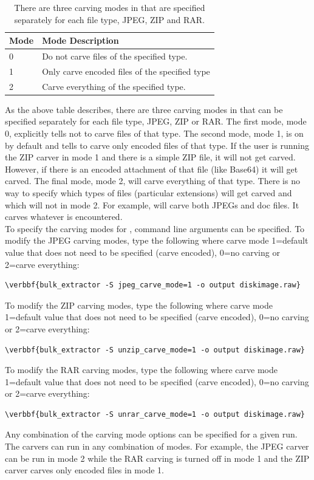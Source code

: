 \documentclass[11pt]{article} %
\begin{document}
\begin{table}[!ht]
\centering
\caption{There are three carving modes in \bulk that are specified separately for each file type, JPEG, ZIP and RAR.}
\label{tab:encodings}
\begin{tabular}{|m{2 cm}|m{7 cm}|}
\hline \hline
\textbf{Mode} & \textbf{Mode Description} \\
\hline
0 & Do not carve files of the specified type.\\
\hline
1 & Only carve encoded files of the specified type \\
\hline
2 & Carve everything of the specified type.\\
\hline
\end{tabular}
\end{table}

As the above table describes, there are three carving modes in \bulk that can be specified separately for each file type, JPEG, ZIP or RAR. The first mode, mode 0, explicitly tells \bulk not to carve files of that type. The second mode, mode 1, is on by default and tells \bulk to carve only encoded files of that type. If the user is running the ZIP carver in mode 1 and there is a simple ZIP file, it will not get carved. However, if there is an encoded attachment of that file (like Base64) it will get carved. The final mode, mode 2, will carve everything of that type. There is no way to specify which types of files (particular extensions) will get carved and which will not in mode 2. For example, \bulk will carve both JPEGs and doc files. It carves whatever is encountered.\\

To specify the carving modes for \bulk, command line arguments can be specified. To modify the JPEG carving modes, type the following where carve mode 1=default value that does not need to be specified (carve encoded), 0=no carving or 2=carve everything:
\begin{Verbatim}[commandchars=\\\{\}]
\verbbf{bulk_extractor -S jpeg_carve_mode=1 -o output diskimage.raw}
\end{Verbatim} 
To modify the ZIP carving modes, type the following  where carve mode 1=default value that does not need to be specified (carve encoded), 0=no carving or 2=carve everything:
\begin{Verbatim}[commandchars=\\\{\}]
\verbbf{bulk_extractor -S unzip_carve_mode=1 -o output diskimage.raw}
\end{Verbatim} 
To modify the RAR carving modes, type the following  where carve mode 1=default value that does not need to be specified (carve encoded), 0=no carving or 2=carve everything:
\begin{Verbatim}[commandchars=\\\{\}]
\verbbf{bulk_extractor -S unrar_carve_mode=1 -o output diskimage.raw}
\end{Verbatim} 
Any combination of the carving mode options can be specified for a given run. The carvers can run in any combination of modes. For example, the JPEG carver can be run in mode 2 while the RAR carving is turned off in mode 1 and the ZIP carver carves only encoded files in mode 1.\\
\end{document}
